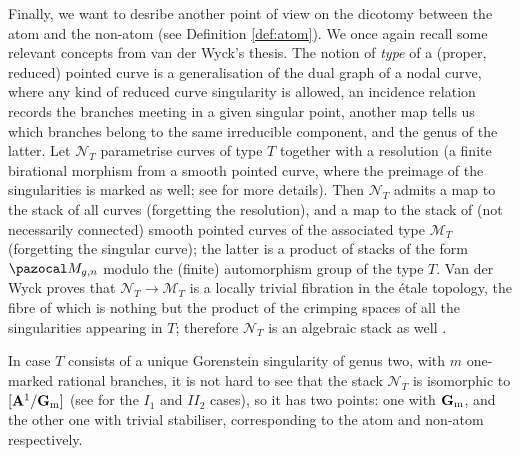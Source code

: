 \documentclass{compositio}
\renewcommand{\k}{\mathbf k}
\renewcommand{\to}{\rightarrow}
\newcommand{\Aaff}{\mathbb A}
\newcommand{\Gm}{\mathbb{G}_{\rm{m}}}
\theoremstyle{plain}
\theoremstyle{definition}
\theoremstyle{remark}
\begin{document}

\smallskip

Finally, we want to desribe another point of view on the dicotomy between the atom and the non-atom (see Definition \ref{def:atom}). We once again recall some relevant concepts from van der Wyck's thesis. The notion of \emph{type} of a (proper, reduced) pointed curve \cite[Definition 1.87]{vdW} is a generalisation of the dual graph of a nodal curve, where any kind of reduced curve singularity is allowed, an incidence relation records the branches meeting in a given singular point, another map tells us which branches belong to the same irreducible component, and the genus of the latter. Let $\mathcal N_T$ parametrise curves of type $T$ together with a resolution (a finite birational morphism from a smooth pointed curve, where the preimage of the singularities is marked as well; see \cite[Definitions 1.95 and 1.100]{vdW} for more details). Then $\mathcal N_T$ admits a map to the stack of all curves (forgetting the resolution), and a map to the stack of (not necessarily connected) smooth pointed curves of the associated type $\mathcal M_T$ (forgetting the singular curve); the latter is a product of stacks of the form $\pazocal M_{g,n}$ modulo the (finite) automorphism group of the type $T$. Van der Wyck proves that $\mathcal N_T\to\mathcal M_T$ is a locally trivial fibration in the \'etale topology, the fibre of which is nothing but the product of the crimping spaces of all the singularities appearing in $T$; therefore $\mathcal N_T$ is an algebraic stack as well \cite[Theorem 1.105 and Corollary 1.106]{vdW}.

In case $T$ consists of a unique Gorenstein singularity of genus two, with $m$ one-marked rational branches, it is not hard to see that the stack $\mathcal N_T$ is isomorphic to $[\Aaff^1/\Gm]$ (see \cite[Examples 1.111-112]{vdW} for the $I_1$ and $I\!I_2$ cases), so it has two points: one with $\Gm$, and the other one with trivial stabiliser, corresponding to the atom and non-atom respectively.
\end{document}
